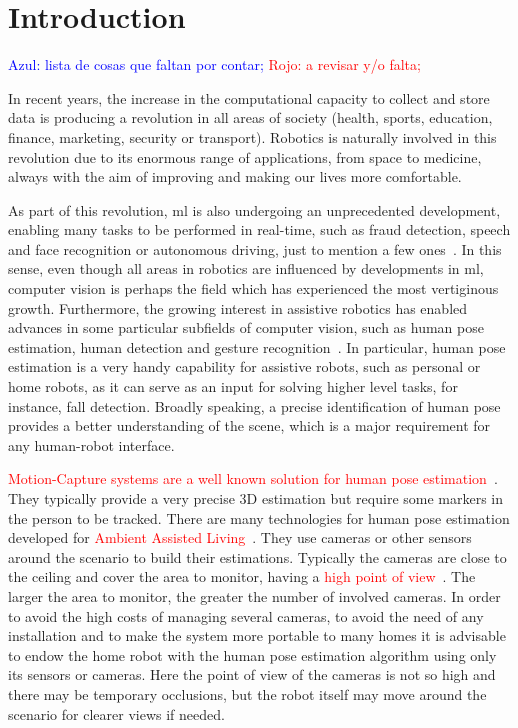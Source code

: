 \chapter{Introduction}\label{ch:introduction}

\textcolor{blue}{Azul: lista de cosas que faltan por contar;} \textcolor{red}{Rojo: a revisar y/o falta;}

In recent years, the increase in the computational capacity to collect and store data is producing a revolution in all areas of society (\eg health, sports, education, finance, marketing, security or transport). Robotics is naturally involved in this revolution due to its enormous range of applications, from space to medicine, always with the aim of improving and making our lives more comfortable. %

As part of this revolution, \gls{ml} is also undergoing an unprecedented development, enabling many tasks to be performed in real-time, such as fraud detection, speech and face recognition or autonomous driving, just to mention a few ones~\cite{liu2017survey}. In this sense, even though all areas in robotics are influenced by developments in \gls{ml}, computer vision is perhaps the field which has experienced the most vertiginous growth. Furthermore, the growing interest in assistive robotics has enabled advances in some particular subfields of computer vision, such as human pose estimation, human detection and gesture recognition~\cite{leo2018deep}. In particular, human pose estimation is a very handy capability for assistive robots, such as personal or home robots, as it can serve as an input for solving higher level tasks, for instance, fall detection. Broadly speaking, a precise identification of human pose provides a better understanding of the scene, which is a major requirement for any human-robot interface.

\textcolor{red}{Motion-Capture systems are a well known solution for human pose estimation~\cite{Vicon}}. They typically provide a very precise 3D estimation but require some markers in the person to be tracked. There are many technologies for human pose estimation developed for \textcolor{red}{Ambient Assisted Living~\cite{}}. They use cameras or other sensors around the scenario to build their estimations. Typically the cameras are close to the ceiling and cover the area to monitor, having a \textcolor{red}{high point of view~\cite{OpenPose}}. The larger the area to monitor, the greater the number of involved cameras. In order to avoid the high costs of managing several cameras, to avoid the need of any installation and to make the system more portable to many homes it is advisable to endow the home robot with the human pose estimation algorithm using only its sensors or cameras. Here the point of view of the cameras is not so high and there may be temporary occlusions, but the robot itself may move around the scenario for clearer views if needed.

